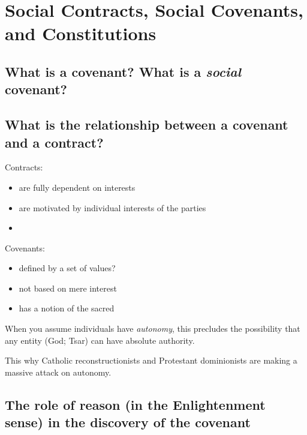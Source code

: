 \documentclass[
]{book}
\providecommand{\tightlist}{%
  \setlength{\itemsep}{0pt}\setlength{\parskip}{0pt}}
\begin{document}
\hypertarget{social-contracts-social-covenants-and-constitutions}{%
\chapter{Social Contracts, Social Covenants, and Constitutions}\label{social-contracts-social-covenants-and-constitutions}}

\hypertarget{what-is-a-covenant-what-is-a-social-covenant}{%
\section{\texorpdfstring{What is a covenant? What is a \emph{social} covenant?}{What is a covenant? What is a social covenant?}}\label{what-is-a-covenant-what-is-a-social-covenant}}

\hypertarget{what-is-the-relationship-between-a-covenant-and-a-contract}{%
\section{What is the relationship between a covenant and a contract?}\label{what-is-the-relationship-between-a-covenant-and-a-contract}}

Contracts:

\begin{itemize}
\tightlist
\item
  are fully dependent on interests
\item
  are motivated by individual interests of the parties
\item
\end{itemize}

Covenants:

\begin{itemize}
\item
  defined by a set of values?
\item
  not based on mere interest
\item
  has a notion of the sacred
\end{itemize}

When you assume individuals have \emph{autonomy}, this precludes the
possibility that any entity (God; Tsar) can have absolute authority.

This why Catholic reconstructionists and Protestant dominionists are making a massive attack on autonomy.

\hypertarget{the-role-of-reason-in-the-enlightenment-sense-in-the-discovery-of-the-covenant}{%
\section{The role of reason (in the Enlightenment sense) in the discovery of the covenant}\label{the-role-of-reason-in-the-enlightenment-sense-in-the-discovery-of-the-covenant}}
\end{document}
